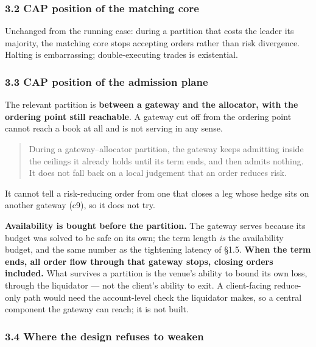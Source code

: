 \documentclass[10pt,a4paper]{article}
\begin{document}
\subsubsection{3.2 CAP position of the matching core}\label{cap-position-of-the-matching-core}

Unchanged from the running case: during a partition that costs the leader its
majority, the matching core stops accepting orders rather than risk divergence.
Halting is embarrassing; double-executing trades is existential.

\subsubsection{3.3 CAP position of the admission plane}\label{cap-position-of-the-admission-plane}

The relevant partition is \textbf{between a gateway and the allocator, with the
ordering point still reachable}. A gateway cut off from the ordering point
cannot reach a book at all and is not serving in any sense.

\begin{quote}
During a gateway--allocator partition, the gateway keeps admitting inside the
ceilings it already holds until its term ends, and then admits nothing. It does
not fall back on a local judgement that an order reduces risk.
\end{quote}

It cannot tell a risk-reducing order from one that closes a leg whose hedge sits
on another gateway (c9), so it does not try.

\textbf{Availability is bought before the partition.} The gateway serves because its
budget was solved to be safe on its own; the term length \emph{is} the availability
budget, and the same number as the tightening latency of §1.5. \textbf{When the term
ends, all order flow through that gateway stops, closing orders included.} What
survives a partition is the venue's ability to bound its own loss, through the
liquidator --- not the client's ability to exit. A client-facing reduce-only path
would need the account-level check the liquidator makes, so a central component
the gateway can reach; it is not built.

\subsubsection{3.4 Where the design refuses to weaken}\label{where-the-design-refuses-to-weaken}
\end{document}
